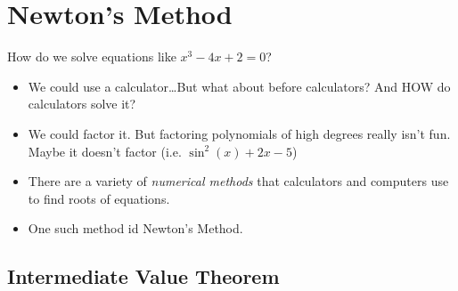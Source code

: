 
\section{Newton's Method}
How do we solve equations like $x^3 - 4x + 2 = 0$?
\begin{itemize}
    \item We could use a calculator\ldots But what about before calculators? And HOW do calculators solve it?
    \item We could factor it. But factoring polynomials of high degrees really isn't fun. Maybe it doesn't factor (i.e. $\sin^2(x) + 2x - 5$)
    \item There are a variety of \textit{numerical methods} that calculators and computers use to find roots of equations.
    \item One such method id Newton's Method.
\end{itemize}
\subsection{Intermediate Value Theorem}
